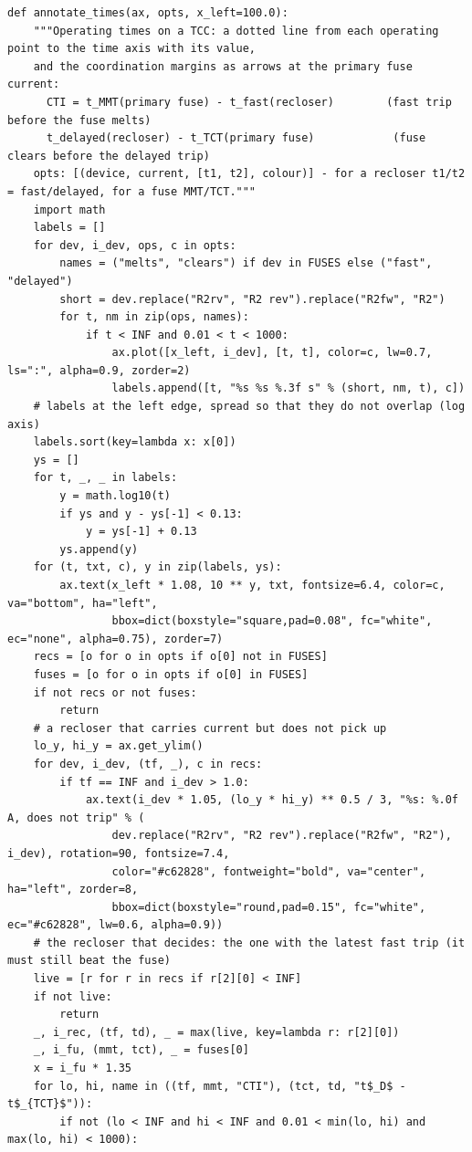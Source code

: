 \documentclass[12pt,a4paper]{article}
\begin{document}
\begin{lstlisting}
def annotate_times(ax, opts, x_left=100.0):
    """Operating times on a TCC: a dotted line from each operating point to the time axis with its value,
    and the coordination margins as arrows at the primary fuse current:
      CTI = t_MMT(primary fuse) - t_fast(recloser)        (fast trip before the fuse melts)
      t_delayed(recloser) - t_TCT(primary fuse)            (fuse clears before the delayed trip)
    opts: [(device, current, [t1, t2], colour)] - for a recloser t1/t2 = fast/delayed, for a fuse MMT/TCT."""
    import math
    labels = []
    for dev, i_dev, ops, c in opts:
        names = ("melts", "clears") if dev in FUSES else ("fast", "delayed")
        short = dev.replace("R2rv", "R2 rev").replace("R2fw", "R2")
        for t, nm in zip(ops, names):
            if t < INF and 0.01 < t < 1000:
                ax.plot([x_left, i_dev], [t, t], color=c, lw=0.7, ls=":", alpha=0.9, zorder=2)
                labels.append([t, "%s %s %.3f s" % (short, nm, t), c])
    # labels at the left edge, spread so that they do not overlap (log axis)
    labels.sort(key=lambda x: x[0])
    ys = []
    for t, _, _ in labels:
        y = math.log10(t)
        if ys and y - ys[-1] < 0.13:
            y = ys[-1] + 0.13
        ys.append(y)
    for (t, txt, c), y in zip(labels, ys):
        ax.text(x_left * 1.08, 10 ** y, txt, fontsize=6.4, color=c, va="bottom", ha="left",
                bbox=dict(boxstyle="square,pad=0.08", fc="white", ec="none", alpha=0.75), zorder=7)
    recs = [o for o in opts if o[0] not in FUSES]
    fuses = [o for o in opts if o[0] in FUSES]
    if not recs or not fuses:
        return
    # a recloser that carries current but does not pick up
    lo_y, hi_y = ax.get_ylim()
    for dev, i_dev, (tf, _), c in recs:
        if tf == INF and i_dev > 1.0:
            ax.text(i_dev * 1.05, (lo_y * hi_y) ** 0.5 / 3, "%s: %.0f A, does not trip" % (
                dev.replace("R2rv", "R2 rev").replace("R2fw", "R2"), i_dev), rotation=90, fontsize=7.4,
                color="#c62828", fontweight="bold", va="center", ha="left", zorder=8,
                bbox=dict(boxstyle="round,pad=0.15", fc="white", ec="#c62828", lw=0.6, alpha=0.9))
    # the recloser that decides: the one with the latest fast trip (it must still beat the fuse)
    live = [r for r in recs if r[2][0] < INF]
    if not live:
        return
    _, i_rec, (tf, td), _ = max(live, key=lambda r: r[2][0])
    _, i_fu, (mmt, tct), _ = fuses[0]
    x = i_fu * 1.35
    for lo, hi, name in ((tf, mmt, "CTI"), (tct, td, "t$_D$ - t$_{TCT}$")):
        if not (lo < INF and hi < INF and 0.01 < min(lo, hi) and max(lo, hi) < 1000):

\end{lstlisting}
\end{document}
